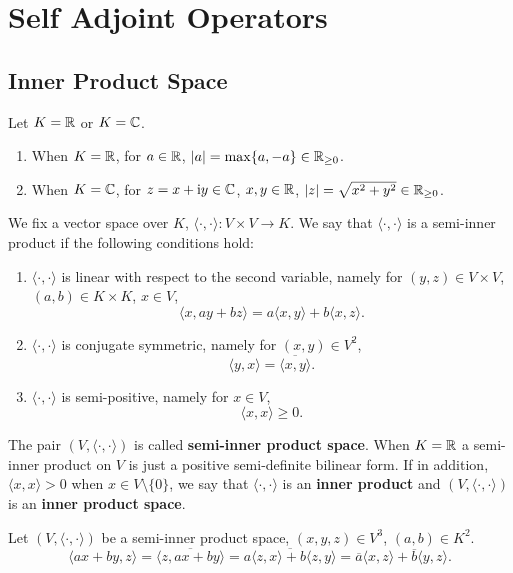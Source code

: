 \chapter{Self Adjoint Operators}
\section{Inner Product Space}
Let $K = \mathbb{R}$ or $K =\mathbb{C}$.
\begin{enumerate}
    \item When $K = \mathbb{R}$, for $a\in \mathbb{R}$, $|a| =\max \{a, -a\} \in \mathbb{R}_{\ge 0}$.
    \item When $K=\mathbb{C}$, for $z = x+ \mathrm{i} y \in \mathbb{C}$, $x,y\in \mathbb{R}$, $|z|= \sqrt{x^2 +y^2} \in \mathbb{R}_{\ge 0}$.
\end{enumerate}
\begin{definitionenv}
    We fix a vector space over $K$, $\langle \cdot,\cdot\rangle : V\times V \rightarrow K$.
    We say that $\langle\cdot,\cdot\rangle$ is a semi-inner product if the following conditions hold:
    \begin{enumerate}
        \item $\langle \cdot ,\cdot\rangle$ is linear with respect to the second variable, namely for $(y,z) \in V\times V$, $(a,b) \in K\times K$, $x\in V$,
        $$ \langle x, ay+bz\rangle = a\langle x,y\rangle + b\langle x,z \rangle.$$
        \item $\langle \cdot ,\cdot\rangle$ is conjugate symmetric, namely for $(x,y)\in V^2$, 
        $$ \langle y ,x\rangle = \overline{\langle x,y\rangle}.$$
        \item $\langle \cdot ,\cdot\rangle$ is semi-positive, namely for $x\in V$,
        $$ \langle x,x\rangle \ge 0.$$
    \end{enumerate}
    The pair $\left(V,\langle \cdot ,\cdot\rangle\right)$ is called \textbf{semi-inner product space}.
    When $K=\mathbb{R}$ a semi-inner product on $V$ is just a positive semi-definite bilinear form. If in addition, $\langle x,x\rangle>0$ when $x\in V\setminus \{0\}$, we say that $\langle \cdot ,\cdot\rangle$ is an \textbf{inner product} and $\left(V,\langle \cdot ,\cdot\rangle\right)$ is an \textbf{inner product space}.
\end{definitionenv}
\begin{remark}
    Let $\left(V,\langle \cdot ,\cdot\rangle\right)$ be a semi-inner product space, $(x,y,z)\in V^3$, $(a,b)\in K^2$.
    $$ \langle ax+by,z\rangle = \overline{\langle z, ax + by\rangle} = \overline{a\langle z,x\rangle + b\langle z,y\rangle} = \overline{a} \langle x,z \rangle +\overline{b} \langle y,z \rangle.$$ 
\end{remark}

